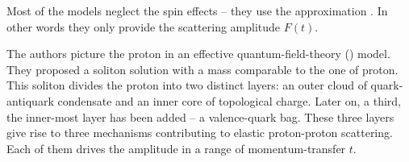 Most of the models neglect the spin effects -- they use the approximation . In other words they only provide the scattering amplitude $F(t)$.


\def\OutlineLabel{The model of Islam et al.}

The authors picture the proton in an effective quantum-field-theory () model. They proposed a soliton solution with a mass comparable to the one of proton. This soliton divides the proton into two distinct layers: an outer cloud of quark-antiquark condensate and an inner core of topological charge. Later on, a third, the inner-most layer has been added -- a valence-quark bag. These three layers give rise to three mechanisms contributing to elastic proton-proton scattering. Each of them drives the amplitude in a range of momentum-transfer $t$.




